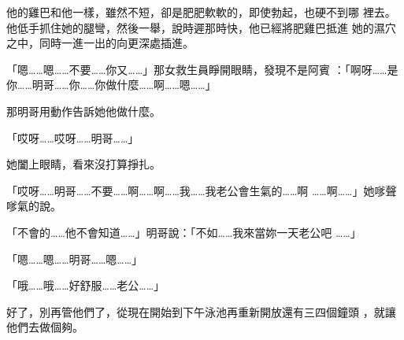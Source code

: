 他的雞巴和他一樣，雖然不短，卻是肥肥軟軟的，即使勃起，也硬不到哪
裡去。他低手抓住她的腿彎，然後一舉，說時遲那時快，他已經將肥雞巴抵進
她的濕穴之中，同時一進一出的向更深處插進。

「嗯……嗯……不要……你又……」那女救生員睜開眼睛，發現不是阿賓
：「啊呀……是你……明哥……你……你做什麼……啊……嗯……」

那明哥用動作告訴她他做什麼。

「哎呀……哎呀……明哥……」

她闔上眼睛，看來沒打算掙扎。

「哎呀……明哥……不要……啊……啊……我……我老公會生氣的……啊
……啊……」她嗲聲嗲氣的說。

「不會的……他不會知道……」明哥說：「不如……我來當妳一天老公吧
……」

「嗯……嗯……明哥……嗯……」

「哦……哦……好舒服……老公……」

好了，別再管他們了，從現在開始到下午泳池再重新開放還有三四個鐘頭
，就讓他們去做個夠。










